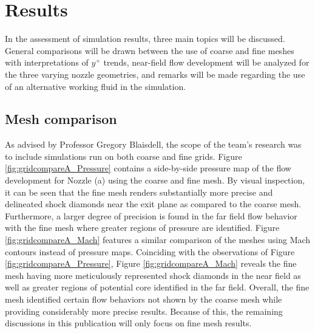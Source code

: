 \documentclass[12pt]{article} %
\begin{document}
\section{Results}
In the assessment of simulation results, three main topics will be discussed. General comparisons will be drawn between the use of coarse and fine meshes with interpretations of $y^+$ trends, near-field flow development will be analyzed for the three varying nozzle geometries, and remarks will be made regarding the use of an alternative working fluid in the simulation.\par

\subsection{Mesh comparison}
As advised by Professor Gregory Blaisdell, the scope of the team's research was to include simulations run on both coarse and fine grids. Figure \ref{fig:gridcompareA_Pressure} contains a side-by-side pressure map of the flow development for Nozzle (a) using the coarse and fine mesh. By visual inspection, it can be seen that the fine mesh renders substantially more precise and delineated shock diamonds near the exit plane as compared to the coarse mesh. Furthermore, a larger degree of precision is found in the far field flow behavior with the fine mesh where greater regions of pressure are identified. Figure \ref{fig:gridcompareA_Mach} features a similar comparison of the meshes using Mach contours instead of pressure maps. Coinciding with the observations of Figure \ref{fig:gridcompareA_Pressure}, Figure \ref{fig:gridcompareA_Mach} reveals the fine mesh having more meticulously represented shock diamonds in the near field as well as greater regions of potential core identified in the far field. Overall, the fine mesh identified certain flow behaviors not shown by the coarse mesh while providing considerably more precise results. Because of this, the remaining discussions in this publication will only focus on fine mesh results.\par
\end{document}

